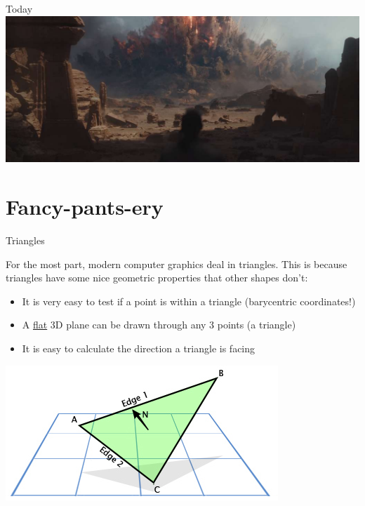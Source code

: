 \documentclass{lug}
\newcommand{\splitslide}[4]{
    \noindent
    \begin{minipage}{#1 \textwidth - #2 }
        #3
    \end{minipage}%
    \hspace{ \dimexpr #2 * 2 \relax }%
    \begin{minipage}{\textwidth - #1 \textwidth - #2 }
        #4
    \end{minipage}
}
\begin{document}
\begin{frame}{Today}
{        \includegraphics[width=\textwidth]{graphics/rogue_one_boom}
    }
\end{frame}

\section{Fancy-pants-ery}

\begin{frame}{Triangles}
    \splitslide{0.65}{.7em}{
        \small

        For the most part, modern computer graphics deal in triangles. This is
        because triangles have some nice geometric properties that other shapes
        don't:

        \begin{itemize}
            \item It is very easy to test if a point is within a triangle (barycentric coordinates!)
            \item A \underline{flat} 3D plane can be drawn through any 3 points (a triangle)
            \item It is easy to calculate the direction a triangle is facing
        \end{itemize}
    }{
        \includegraphics[width=\textwidth]{graphics/triangle}
    }
\end{frame}
\end{document}
